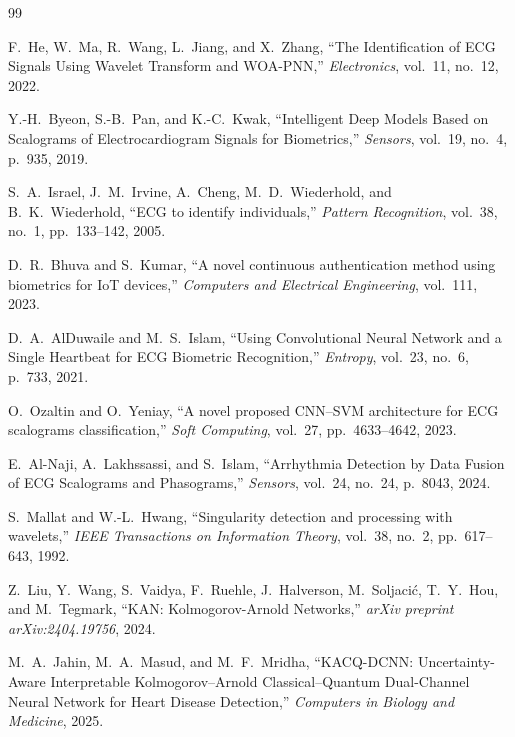 \documentclass[12pt, a4paper]{article}
\begin{document}
\vspace{10pt}



\begin{thebibliography}{99}

F.~He, W.~Ma, R.~Wang, L.~Jiang, and X.~Zhang,
``The Identification of ECG Signals Using Wavelet Transform and WOA-PNN,''
\textit{Electronics}, vol.~11, no.~12, 2022.

Y.-H.~Byeon, S.-B.~Pan, and K.-C.~Kwak,
``Intelligent Deep Models Based on Scalograms of Electrocardiogram Signals
for Biometrics,''
\textit{Sensors}, vol.~19, no.~4, p.~935, 2019.

S.~A.~Israel, J.~M.~Irvine, A.~Cheng, M.~D.~Wiederhold, and B.~K.~Wiederhold,
``ECG to identify individuals,''
\textit{Pattern Recognition}, vol.~38, no.~1, pp.~133--142, 2005.

D.~R.~Bhuva and S.~Kumar,
``A novel continuous authentication method using biometrics for IoT devices,''
\textit{Computers and Electrical Engineering}, vol.~111, 2023.

D.~A.~AlDuwaile and M.~S.~Islam,
``Using Convolutional Neural Network and a Single Heartbeat for ECG Biometric
Recognition,''
\textit{Entropy}, vol.~23, no.~6, p.~733, 2021.

O.~Ozaltin and O.~Yeniay,
``A novel proposed CNN--SVM architecture for ECG scalograms classification,''
\textit{Soft Computing}, vol.~27, pp.~4633--4642, 2023.

E.~Al-Naji, A.~Lakhssassi, and S.~Islam,
``Arrhythmia Detection by Data Fusion of ECG Scalograms and Phasograms,''
\textit{Sensors}, vol.~24, no.~24, p.~8043, 2024.

S.~Mallat and W.-L.~Hwang,
``Singularity detection and processing with wavelets,''
\textit{IEEE Transactions on Information Theory},
vol.~38, no.~2, pp.~617--643, 1992.

Z.~Liu, Y.~Wang, S.~Vaidya, F.~Ruehle, J.~Halverson, M.~Soljaci\'c,
T.~Y.~Hou, and M.~Tegmark,
``KAN: Kolmogorov-Arnold Networks,''
\textit{arXiv preprint arXiv:2404.19756}, 2024.

M.~A.~Jahin, M.~A.~Masud, and M.~F.~Mridha,
``KACQ-DCNN: Uncertainty-Aware Interpretable Kolmogorov--Arnold
Classical--Quantum Dual-Channel Neural Network for Heart Disease Detection,''
\textit{Computers in Biology and Medicine}, 2025.


\end{thebibliography}
\end{document}
